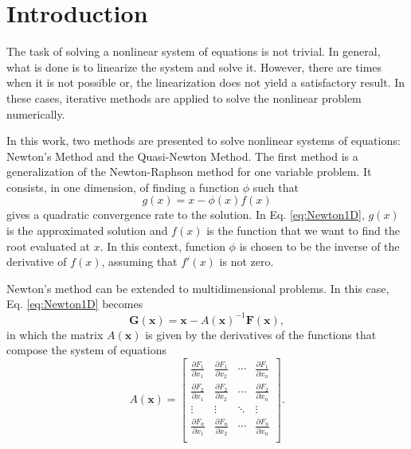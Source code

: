 \section{Introduction} \label{sec:introduction}
The task of solving a nonlinear system of equations is not trivial. In general, what is done is to linearize the system and solve it. However, there are times when it is not possible or, the linearization does not yield a satisfactory result. In these cases, iterative methods are applied to solve the nonlinear problem numerically. 

In this work, two methods are presented to solve nonlinear systems of equations: Newton's Method and the Quasi-Newton Method. The first method is a generalization of the Newton-Raphson method for one variable problem. It consists, in one dimension, of finding a function $\phi$ such that 
\begin{equation}
    g(x) = x - \phi(x) f(x)
    \label{eq:Newton1D}
\end{equation}
gives a quadratic convergence rate to the solution. In Eq. \eqref{eq:Newton1D}, $g(x)$ is the approximated solution and $f(x)$ is the function that we want to find the root evaluated at $x$. In this context, function $\phi$ is chosen to be the inverse of the derivative of $f(x)$, assuming that $f'(x)$ is not zero.

Newton's method can be extended to multidimensional problems. In this case, Eq. \eqref{eq:Newton1D} becomes
\begin{equation}
    \bm{G}(\bm{x}) = \bm{x} - A(\bm{x})^{-1} \bm{F}(\bm{x}),
    \label{eq:NewtonND}
\end{equation} 
in which the matrix $A(\bm{x})$ is given by the derivatives of the functions that compose the system of equations 
\begin{equation}
    A(\bm{x}) = \begin{bmatrix}
        \frac{\partial F_1}{\partial x_1} & \frac{\partial F_1}{\partial x_2} & \cdots & \frac{\partial F_1}{\partial x_n} \\
        \frac{\partial F_2}{\partial x_1} & \frac{\partial F_2}{\partial x_2} & \cdots & \frac{\partial F_2}{\partial x_n} \\
        \vdots & \vdots & \ddots & \vdots \\
        \frac{\partial F_n}{\partial x_1} & \frac{\partial F_n}{\partial x_2} & \cdots & \frac{\partial F_n}{\partial x_n} \\
    \end{bmatrix}.
    \label{eq:SecantND}
\end{equation}

